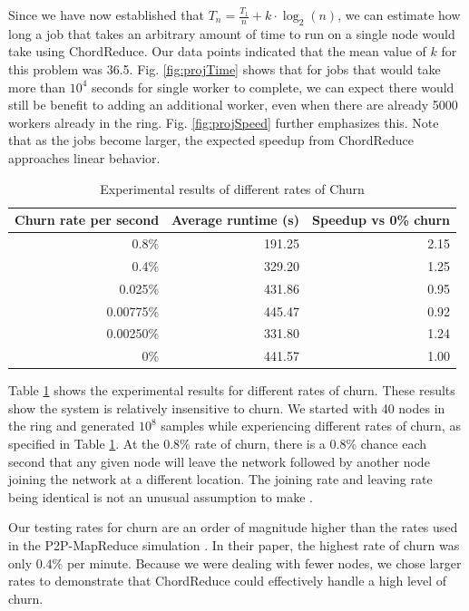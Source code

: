 
Since we have now established that $T_{n} = \frac{T_{1}}{n} + k \cdot \log_{2}(n)$, we can estimate how long a job that takes an arbitrary amount of time to run on a single node would take using ChordReduce.  Our data points indicated that the mean value of $k$ for this problem was 36.5.  Fig. \ref{fig:projTime} shows that for jobs that would take more than $10^{4}$ seconds for single worker to complete, we can expect there would still be benefit to adding an additional worker, even when there are already 5000 workers already in the ring.  Fig. \ref{fig:projSpeed} further emphasizes this. Note that as the jobs become larger, the expected speedup from ChordReduce  approaches linear behavior.


\begin{table}
	\centering
	\begin{tabular}{|r|r|r|} 
		\hline 
		Churn rate per second & Average runtime (s) & Speedup vs 0\% churn\\ \hline{}
		0.8\% & 191.25 & 2.15 \\ \hline
		0.4\% & 329.20 & 1.25 \\ \hline
		0.025\% & 431.86 & 0.95 \\ \hline 
		0.00775\%  & 445.47 & 0.92 \\ \hline 
		0.00250\% & 331.80  &  1.24 \\ \hline 
		0\% & 441.57 & 1.00 \\ \hline
	\end{tabular}
	\caption{Experimental results of different rates of Churn} 
	\label{tab:churnSpeed}
\end{table}


Table \ref{tab:churnSpeed} shows the experimental results for different rates of churn. These results show the system  is relatively insensitive to churn.  We started with 40 nodes in the ring and generated $10^{8}$ samples while experiencing different rates of churn, as specified in Table \ref{tab:churnSpeed}.  At the 0.8\% rate of churn, there is a 0.8\% chance each second that any given node will leave the network followed by another node joining the network at a different location. The joining rate and leaving rate being identical is not an unusual assumption to make \cite{marozzo2012p2p} \cite{load}.  

Our testing rates for churn are an order of magnitude higher than the rates used in the P2P-MapReduce simulation  \cite{marozzo2012p2p}.  In their paper, the highest rate of churn was only 0.4\% per minute. Because we were dealing with fewer nodes, we chose larger rates to demonstrate that ChordReduce could effectively handle a high level of churn.  


